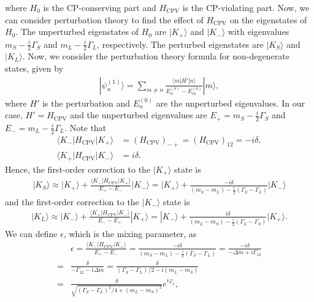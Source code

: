 where $H_0$ is the CP-conserving part and $H_{\text{CPV}}$ is the CP-violating part. Now, we can consider perturbation theory to find the effect of $H_{\text{CPV}}$ on the eigenstates of $H_0$. The unperturbed eigenstates of $H_0$ are $|K_+\rangle$ and $|K_-\rangle$ with eigenvalues $m_S - \frac{i}{2}\Gamma_S$ and $m_L - \frac{i}{2}\Gamma_L$, respectively. The perturbed eigenstates are $|K_S\rangle$ and $|K_L\rangle$. Now, we consider the perturbation theory formula for non-degenerate states, given by 
\begin{align}
    |\psi_n^{(1)}\rangle = \sum_{m\neq n} \frac{\langle m|H'|n\rangle}{E_n^{(0)} - E_m^{(0)}} |m\rangle,
\end{align}
where $H'$ is the perturbation and $E_n^{(0)}$ are the unperturbed eigenvalues. In our case, $H' = H_{\text{CPV}}$ and the unperturbed eigenvalues are $E_+ = m_S - \frac{i}{2}\Gamma_S$ and $E_- = m_L - \frac{i}{2}\Gamma_L$. Note that 
\begin{align}
    \langle K_-|H_{\text{CPV}}|K_+\rangle &= (H_{\text{CPV}})_{-+} = (H_{\text{CPV}})_{12} = -i\delta, \\
    \langle K_+|H_{\text{CPV}}|K_-\rangle &= i\delta.
\end{align}
Hence, the first-order correction to the $|K_+\rangle$ state is
\begin{align}
    |K_S\rangle \approx |K_+\rangle + \frac{\langle K_-|H_{\text{CPV}}|K_+\rangle}{E_+ - E_-} |K_-\rangle = |K_+\rangle + \frac{-i\delta}{(m_S - m_L) - \frac{i}{2}(\Gamma_S - \Gamma_L)} |K_-\rangle 
\end{align}
and the first-order correction to the $|K_-\rangle$ state is
\begin{align}
    |K_L\rangle \approx |K_-\rangle + \frac{\langle K_+|H_{\text{CPV}}|K_-\rangle}{E_- - E_+} |K_+\rangle = |K_-\rangle + \frac{i\delta}{(m_L - m_S) - \frac{i}{2}(\Gamma_L - \Gamma_S)} |K_+\rangle.
\end{align}
We can define $\epsilon$, which is the mixing parameter, as
\begin{align}
    &\epsilon = \frac{\langle K_-|H_{\text{CPV}}|K_+\rangle}{E_+ - E_-} = \frac{-i\delta}{(m_S - m_L) - \frac{i}{2}(\Gamma_S - \Gamma_L)}=\frac{-i\delta}{-\Delta m +i \Gamma_{12}}\\
    =& \frac{\delta}{-\Gamma_{12} - i\Delta m} =\frac{\delta}{(\Gamma_S-\Gamma_L) /2 - i(m_L - m_S)}\\
    =& \frac{\delta}{\sqrt{(\Gamma_S-\Gamma_L)^2/4 + (m_L - m_S)^2}} e^{i\varphi_\epsilon},
\end{align}
